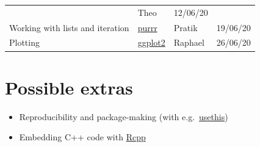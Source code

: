 \documentclass[]{book}
\providecommand{\tightlist}{%
  \setlength{\itemsep}{0pt}\setlength{\parskip}{0pt}}
\begin{document}
\begin{longtable}[]{@{}llll@{}}
\begin{minipage}[t]{0.22\columnwidth}
\end{minipage} & \begin{minipage}[t]{0.22\columnwidth}\raggedright
Theo\strut
\end{minipage} & \begin{minipage}[t]{0.22\columnwidth}\raggedright
12/06/20\strut
\end{minipage}\tabularnewline
\begin{minipage}[t]{0.22\columnwidth}\raggedright
Working with lists and iteration\strut
\end{minipage} & \begin{minipage}[t]{0.22\columnwidth}\raggedright
\href{https://purrr.tidyverse.org/}{purrr}\strut
\end{minipage} & \begin{minipage}[t]{0.22\columnwidth}\raggedright
Pratik\strut
\end{minipage} & \begin{minipage}[t]{0.22\columnwidth}\raggedright
19/06/20\strut
\end{minipage}\tabularnewline
\begin{minipage}[t]{0.22\columnwidth}\raggedright
Plotting\strut
\end{minipage} & \begin{minipage}[t]{0.22\columnwidth}\raggedright
\href{https://ggplot2.tidyverse.org/}{ggplot2}\strut
\end{minipage} & \begin{minipage}[t]{0.22\columnwidth}\raggedright
Raphael\strut
\end{minipage} & \begin{minipage}[t]{0.22\columnwidth}\raggedright
26/06/20\strut
\end{minipage}\tabularnewline
\bottomrule
\end{longtable}

\hypertarget{possible-extras}{%
\section*{Possible extras}\label{possible-extras}}

\begin{itemize}
\tightlist
\item
  Reproducibility and package-making (with e.g.~\href{https://usethis.r-lib.org/}{usethis})\\
\item
  Embedding C++ code with \href{http://adv-r.had.co.nz/Rcpp.html}{Rcpp}
\end{itemize}
\end{document}
